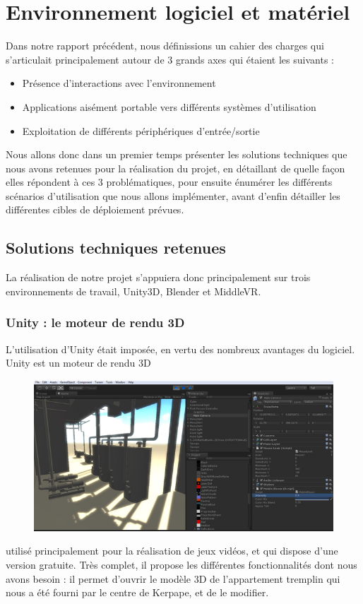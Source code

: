 \section{Environnement logiciel et matériel}

Dans notre rapport précédent, nous définissions un cahier des charges qui s'articulait principalement autour de 3 grands axes qui étaient les suivants : 
\begin{itemize}\renewcommand{\labelitemi}{$\bullet$}
\item Présence d'interactions avec l'environnement
\item Applications aisément portable vers différents systèmes d'utilisation
\item Exploitation de différents périphériques d'entrée/sortie
\end{itemize}
Nous allons donc dans un premier temps présenter les solutions techniques que nous avons retenues pour la réalisation du projet, en détaillant de quelle façon elles répondent à ces 3 problématiques, pour ensuite énumérer les différents scénarios d'utilisation que nous allons implémenter, avant d'enfin détailler les différentes cibles de déploiement prévues. 

\subsection{Solutions techniques retenues}
La réalisation de notre projet s'appuiera donc principalement sur trois environnements de travail, Unity3D, Blender et MiddleVR.

\subsubsection{Unity : le moteur de rendu 3D}
L'utilisation d'Unity était imposée, en vertu des nombreux avantages du logiciel. Unity est un moteur de rendu 3D
\begin{figure}
	\centering
	\includegraphics[scale=0.5]{2-Specifications/img-utilisateur/screen_unity.jpg}
\end{figure}
utilisé principalement pour la réalisation de jeux vidéos, et qui dispose d'une version gratuite. Très complet, il propose les différentes fonctionnalités dont nous avons besoin : il permet d'ouvrir le modèle 3D de l'appartement tremplin qui nous a été fourni par le centre de Kerpape, et de le modifier. \newline

